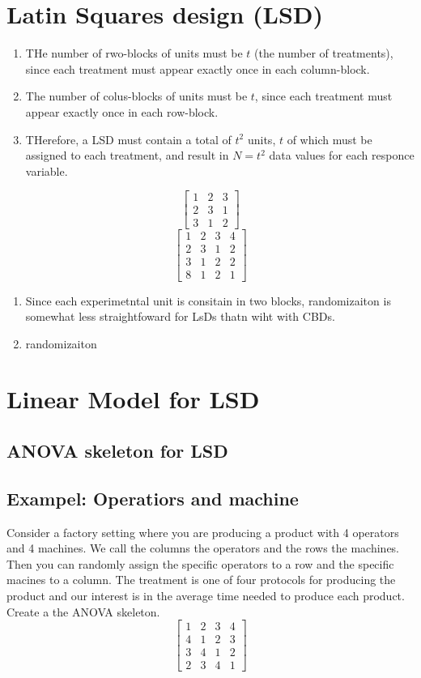 \documentclass[10pt, oneside]{article}
\begin{document}
\section{Latin Squares design (LSD)}
\begin{enumerate}
	\item THe number of rwo-blocks of units must be  $t$ (the number of
	      treatments), since each treatment must appear exactly once in each column-block.
	\item The number of colus-blocks of units must be $t$, since each treatment
	      must appear exactly once in each row-block.
	\item THerefore, a LSD must contain a total of $t^2$ units, $t$ of which
	      must be assigned to each treatment, and result in $N=t^2$ data
	      values for each responce variable.
\end{enumerate}
$$
	\begin{bmatrix}
		1 & 2 & 3 \\
		2 & 3 & 1 \\
		3 & 1 & 2
	\end{bmatrix}
$$
$$
	\begin{bmatrix}
		1 & 2 & 3 & 4 \\
		2 & 3 & 1 & 2 \\
		3 & 1 & 2 & 2 \\
		8 & 1 & 2 & 1
	\end{bmatrix}
$$
\begin{enumerate}
	\item Since each experimetntal unit is consitain in two blocks,
	      randomizaiton is somewhat less straightfoward for LsDs thatn wiht
	      with CBDs.
	\item randomizaiton
\end{enumerate}

\section{Linear Model for LSD}
\subsection{ANOVA skeleton for LSD}
\subsection{Exampel: Operatiors and machine}
Consider a factory setting where you are producing a product with 4
operators and 4 machines. We call the columns the operators and
the rows the machines. Then you can randomly assign the specific
operators to a row and the specific macines to a column. The
treatment is one of four protocols for producing the product and our
interest is in the average time needed to produce each product.
Create a the ANOVA skeleton.
$$
	\begin{bmatrix}
		1 & 2 & 3 & 4 \\
		4 & 1 & 2 & 3 \\
		3 & 4 & 1 & 2 \\
		2 & 3 & 4 & 1
	\end{bmatrix}
$$
\end{document}
